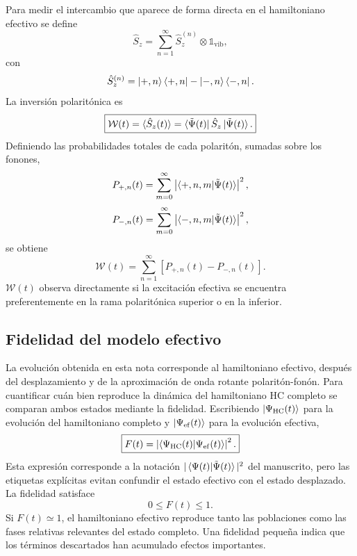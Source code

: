 \documentclass[11pt]{article}
\newcommand{\Id}{\mathds{1}}
\begin{document}
Para medir el intercambio que aparece de forma directa en el hamiltoniano
efectivo se define
\begin{equation}
  \hat S_z
  =
  \sum_{n=1}^{\infty}
  \hat S_z^{(n)}
  \otimes\Id_{\mathrm{vib}},
\end{equation}
con
\begin{equation}
  \hat S_z^{(n)}
  =
  \ket{+,n}\bra{+,n}
  -
  \ket{-,n}\bra{-,n}.
\end{equation}
La inversi\'on polarit\'onica es
\begin{equation}
  \boxed{
  \mathcal W(t)
  =
  \langle\hat S_z(t)\rangle
  =
  \bra{\tilde\Psi(t)}
  \hat S_z
  \ket{\tilde\Psi(t)}.
  }
\end{equation}
Definiendo las probabilidades totales de cada polarit\'on, sumadas sobre los
fonones,
\begin{equation}
  P_{+,n}(t)
  =
  \sum_{m=0}^{\infty}
  \left|
  \braket{+,n,m|\tilde\Psi(t)}
  \right|^2,
\end{equation}
\begin{equation}
  P_{-,n}(t)
  =
  \sum_{m=0}^{\infty}
  \left|
  \braket{-,n,m|\tilde\Psi(t)}
  \right|^2,
\end{equation}
se obtiene
\begin{equation}
  \boxed{
  \mathcal W(t)
  =
  \sum_{n=1}^{\infty}
  \left[
  P_{+,n}(t)-P_{-,n}(t)
  \right].
  }
\end{equation}
$\mathcal W(t)$ observa directamente si la excitaci\'on efectiva se encuentra
preferentemente en la rama polarit\'onica superior o en la inferior.

\subsection{Fidelidad del modelo efectivo}

La evoluci\'on obtenida en esta nota corresponde al hamiltoniano efectivo,
despu\'es del desplazamiento y de la aproximaci\'on de onda rotante
polarit\'on-fon\'on. Para cuantificar cu\'an bien reproduce la din\'amica del
hamiltoniano HC completo se comparan ambos estados mediante la fidelidad.
Escribiendo $\ket{\Psi_{\mathrm{HC}}(t)}$ para la evoluci\'on del hamiltoniano
completo y $\ket{\Psi_{\mathrm{ef}}(t)}$ para la evoluci\'on efectiva,
\begin{equation}
  \boxed{
  F(t)
  =
  \left|
  \braket{\Psi_{\mathrm{HC}}(t)|\Psi_{\mathrm{ef}}(t)}
  \right|^2.
  }
\end{equation}
Esta expresi\'on corresponde a la notaci\'on
$|\braket{\Psi(t)|\tilde\Psi(t)}|^2$ del manuscrito, pero las etiquetas
expl\'icitas evitan confundir el estado efectivo con el estado desplazado.
La fidelidad satisface
\begin{equation}
  0\leq F(t)\leq1.
\end{equation}
Si $F(t)\simeq1$, el hamiltoniano efectivo reproduce tanto las poblaciones como
las fases relativas relevantes del estado completo. Una fidelidad peque\~na
indica que los t\'erminos descartados han acumulado efectos importantes.
\end{document}
